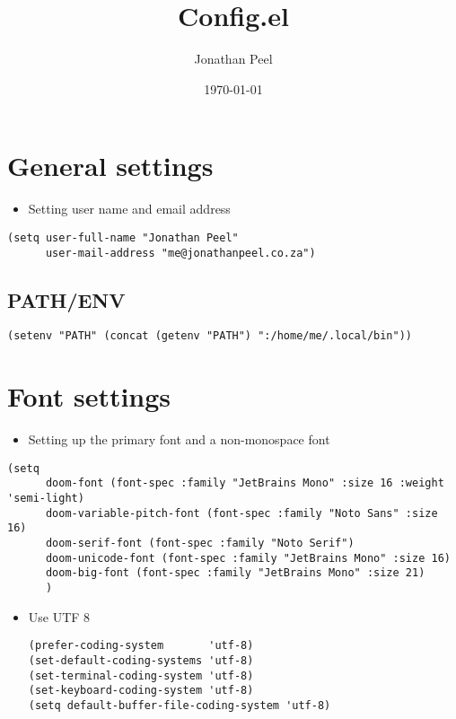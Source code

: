 \documentclass[11pt]{article}
\author{Jonathan Peel}
\date{\today}
\title{Config.el}
\begin{document}
\maketitle
\tableofcontents

\section{General settings}
\label{sec:org1090172}

\begin{itemize}
\item Setting user name and email address
\end{itemize}
\begin{verbatim}
(setq user-full-name "Jonathan Peel"
      user-mail-address "me@jonathanpeel.co.za")
\end{verbatim}
\subsection{PATH/ENV}
\label{sec:org1d0b533}

\begin{verbatim}
(setenv "PATH" (concat (getenv "PATH") ":/home/me/.local/bin"))
\end{verbatim}
\section{Font settings}
\label{sec:org3426632}

\begin{itemize}
\item Setting up the primary font and a non-monospace font
\end{itemize}
\begin{verbatim}
(setq
      doom-font (font-spec :family "JetBrains Mono" :size 16 :weight 'semi-light)
      doom-variable-pitch-font (font-spec :family "Noto Sans" :size 16)
      doom-serif-font (font-spec :family "Noto Serif")
      doom-unicode-font (font-spec :family "JetBrains Mono" :size 16)
      doom-big-font (font-spec :family "JetBrains Mono" :size 21)
      )
\end{verbatim}



\begin{itemize}
\item Use UTF 8

\begin{verbatim}
(prefer-coding-system       'utf-8)
(set-default-coding-systems 'utf-8)
(set-terminal-coding-system 'utf-8)
(set-keyboard-coding-system 'utf-8)
(setq default-buffer-file-coding-system 'utf-8)
\end{verbatim}
\end{itemize}
\end{document}

